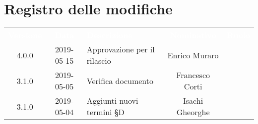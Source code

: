 
\section{Registro delle modifiche}
{
	\renewcommand{\arraystretch}{1.5}
	\centering
	\begin{longtable}{ c c  C{4cm}  c  c }
		
		\textcolor{white}{\textbf{Versione}} & \textcolor{white}{\textbf{Data}} & \textcolor{white}{\textbf{Descrizione}} & \textcolor{white}{\textbf{Nominativo}} & \textcolor{white}{\textbf{Ruolo}}\\
		
		4.0.0 & 2019-05-15 & Approvazione per il rilascio & Enrico Muraro & \Res{}\\
		
		3.1.0 & 2019-05-05 & Verifica documento & Francesco Corti &\ver{}\\
		
		3.1.0 & 2019-05-04 & Aggiunti nuovi termini \S{D} & Isachi Gheorghe &\reda{}\\		
		
	\end{longtable}

}
